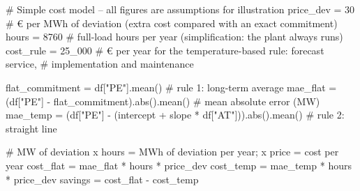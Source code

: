 \documentclass[
  letterpaper,
  DIV=11,
  numbers=noendperiod]{scrreprt}
\newenvironment{Shaded}{\begin{snugshade}}{\end{snugshade}}
\newcommand{\BuiltInTok}[1]{\textcolor[rgb]{0.00,0.23,0.31}{#1}}
\newcommand{\CommentTok}[1]{\textcolor[rgb]{0.37,0.37,0.37}{#1}}
\newcommand{\DecValTok}[1]{\textcolor[rgb]{0.68,0.00,0.00}{#1}}
\newcommand{\NormalTok}[1]{\textcolor[rgb]{0.00,0.23,0.31}{#1}}
\newcommand{\OperatorTok}[1]{\textcolor[rgb]{0.37,0.37,0.37}{#1}}
\newcommand{\StringTok}[1]{\textcolor[rgb]{0.13,0.47,0.30}{#1}}
\begin{document}
\begin{Shaded}
\begin{Highlighting}[]
\CommentTok{\# Simple cost model – all figures are assumptions for illustration}
\NormalTok{price\_dev }\OperatorTok{=} \DecValTok{30}          \CommentTok{\# € per MWh of deviation (extra cost compared with an exact commitment)}
\NormalTok{hours }\OperatorTok{=} \DecValTok{8760}            \CommentTok{\# full{-}load hours per year (simplification: the plant always runs)}
\NormalTok{cost\_rule }\OperatorTok{=} \DecValTok{25\_000}      \CommentTok{\# € per year for the temperature{-}based rule: forecast service,}
                        \CommentTok{\# implementation and maintenance}

\NormalTok{flat\_commitment }\OperatorTok{=}\NormalTok{ df[}\StringTok{"PE"}\NormalTok{].mean()                                     }\CommentTok{\# rule 1: long{-}term average}
\NormalTok{mae\_flat }\OperatorTok{=}\NormalTok{ (df[}\StringTok{"PE"}\NormalTok{] }\OperatorTok{{-}}\NormalTok{ flat\_commitment).}\BuiltInTok{abs}\NormalTok{().mean()                 }\CommentTok{\# mean absolute error (MW)}
\NormalTok{mae\_temp }\OperatorTok{=}\NormalTok{ (df[}\StringTok{"PE"}\NormalTok{] }\OperatorTok{{-}}\NormalTok{ (intercept }\OperatorTok{+}\NormalTok{ slope }\OperatorTok{*}\NormalTok{ df[}\StringTok{"AT"}\NormalTok{])).}\BuiltInTok{abs}\NormalTok{().mean()  }\CommentTok{\# rule 2: straight line}

\CommentTok{\# MW of deviation x hours = MWh of deviation per year; x price = cost per year}
\NormalTok{cost\_flat }\OperatorTok{=}\NormalTok{ mae\_flat }\OperatorTok{*}\NormalTok{ hours }\OperatorTok{*}\NormalTok{ price\_dev}
\NormalTok{cost\_temp }\OperatorTok{=}\NormalTok{ mae\_temp }\OperatorTok{*}\NormalTok{ hours }\OperatorTok{*}\NormalTok{ price\_dev}
\NormalTok{savings }\OperatorTok{=}\NormalTok{ cost\_flat }\OperatorTok{{-}}\NormalTok{ cost\_temp}


\end{Highlighting}
\end{Shaded}
\end{document}
